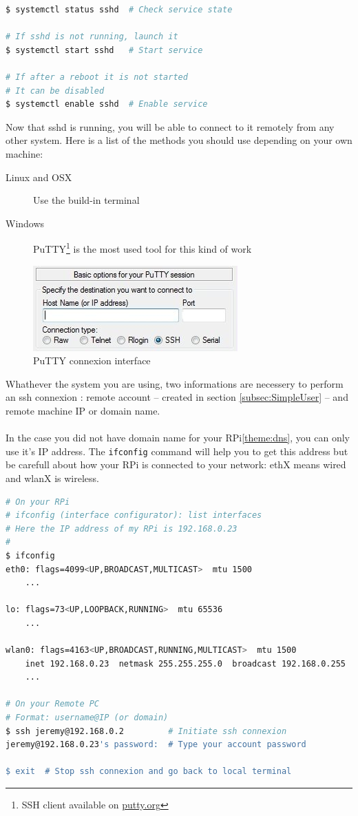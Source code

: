 \begin{lstlisting}[language=bash,caption=Check service state]
$ systemctl status sshd  # Check service state

# If sshd is not running, launch it
$ systemctl start sshd   # Start service

# If after a reboot it is not started
# It can be disabled
$ systemctl enable sshd  # Enable service
\end{lstlisting}

Now that sshd is running, you will be able to connect to it remotely from any 
other system. Here is a list of the methods you should use depending on your own 
machine:

\begin{description}
	\item[Linux and OSX] Use the build-in terminal 
	\item[Windows] PuTTY\footnote{SSH client available on 
					\href{http://www.putty.org}{putty.org}} is the most used 
					tool for this kind of work
\end{description}

\begin{figure}[h]
	\centering
	\includegraphics[scale=0.6]{images/PuttyConnect.png}
	\caption{PuTTY connexion interface}
	\label{figure:WifiMenu}
\end{figure}

\label{theme:ip}
Whathever the system you are using, two informations are necessery to perform 
an ssh connexion : remote account --  created in section \ref{subsec:SimpleUser} 
-- and remote machine IP or domain name.
\\\\
In the case you did not have domain name for your RPi\ref{theme:dns}, you can only 
use it's IP address. The \texttt{ifconfig} command will help you to get this 
address but be carefull about how your RPi is connected to your network: ethX 
means wired and wlanX is wireless.

\begin{lstlisting}[language=bash,caption=SSH with command line]
# On your RPi
# ifconfig (interface configurator): list interfaces
# Here the IP address of my RPi is 192.168.0.23
#
$ ifconfig
eth0: flags=4099<UP,BROADCAST,MULTICAST>  mtu 1500
	...

lo: flags=73<UP,LOOPBACK,RUNNING>  mtu 65536
    ...

wlan0: flags=4163<UP,BROADCAST,RUNNING,MULTICAST>  mtu 1500
    inet 192.168.0.23  netmask 255.255.255.0  broadcast 192.168.0.255
    ...
     
# On your Remote PC
# Format: username@IP (or domain)
$ ssh jeremy@192.168.0.2         # Initiate ssh connexion
jeremy@192.168.0.23's password:  # Type your account password

$ exit  # Stop ssh connexion and go back to local terminal
\end{lstlisting}

